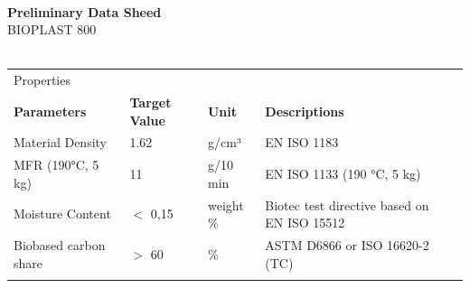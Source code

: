 \documentclass{article}
\begin{document}
\begin{flushleft}
\hspace{1cm}\\
\textbf{Preliminary Data Sheed}\\
BIOPLAST 800\\
\hspace{1cm}\\
\end{flushleft}
\begin{center}
\begin{tabularx}
{\textwidth}{X l  l  l  l }\rowcolor{color_title}Properties &  &  &  &  \\
\textbf{Parameters} & \textbf{Target Value} & \textbf{Unit} & \textbf{Descriptions} &  \\
Material Density  & 1.62 & g/cm³ & EN ISO 1183 &  \\
\arrayrulecolor{line_color}\hline
MFR (190°C, 5 kg) & 11 & g/10 min & EN ISO 1133 (190 °C, 5 kg) &  \\
\arrayrulecolor{line_color}\hline
Moisture Content & \(<\) 0,15 & weight \% & Biotec test directive based on EN ISO 15512 &  \\
\arrayrulecolor{line_color}\hline
Biobased carbon share & \(>\) 60 & \% & ASTM D6866 or ISO 16620-2 (TC) &  \\
\arrayrulecolor{line_color}\hline

\end{tabularx}
\end{center}
\end{document}
